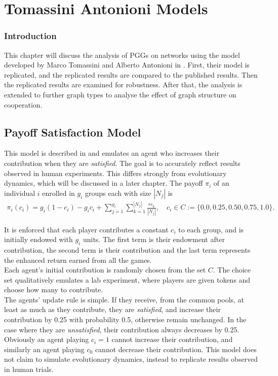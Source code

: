 \section{Tomassini Antonioni Models}

\subsubsection{Introduction}
This chapter will discuss the analysis of PGGs on networks using the model developed by Marco Tomassini and Alberto Antonioni in \cite{RN49}. First, their model is replicated, and the replicated results are compared to the published results. Then the replicated results are examined for robustness. After that, the analysis is extended to further graph types to analyse the effect of graph structure on cooperation. \\

\subsection{Payoff Satisfaction Model}
This model is described in \cite{RN49} and emulates an agent who increases their contribution when they are \emph{satisfied}. The goal is to accurately reflect results observed in human experiments. This differs strongly from evolutionary dynamics, which will be discussed in a later chapter. The payoff $\pi_i$ of an individual $i$ enrolled in $g_i$ groups each with size $|N_j|$ is \\
\begin{align} 
    \pi_i(c_i) = g_i(1-c_i) - g_ic_i + \sum_{j=1}^{g_i} \sum_{k=1}^{|N_j|} \frac{rc_k}{|N_j|}, \quad c_i \in C:= \{0.0, 0.25, 0.50, 0.75, 1.0\}. 
\end{align}

It is enforced that each player contributes a constant $c_i$ to each group, and is initially endowed with $g_i$ units. The first term is their endowment after contribution, the second term is their contribution and the last term represents the enhanced return earned from all the games. \\

Each agent's initial contribution is randomly chosen from the set $C$. The choice set qualitatively emulates a lab experiment, where players are given tokens and choose how many to contribute. \\

The agents' update rule is simple. If they receive, from the common pools, at least as much as they contribute, they are \emph{satisfied}, and increase their contribution by 0.25 with probability 0.5, otherwise remain unchanged. In the case where they are \emph{unsatisfied}, their contribution always decreases by 0.25. Obviously an agent playing $c_i =1$ cannot increase their contribution, and similarly an agent playing $c_0$ cannot decrease their contribution. This model does not claim to simulate evolutionary dynamics, instead to replicate results observed in human trials. \\


